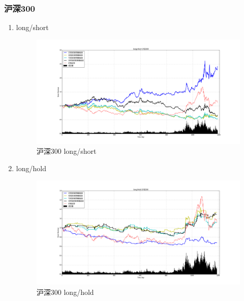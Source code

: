 \documentclass[12pt,a4paper]{article}
\begin{document}
\subsubsection{沪深300}
\begin{enumerate}
\item long/short 
\begin{figure}[H]
	\centering
	\includegraphics[width=1.0\textwidth]{img_r_7/hs300.png}
	\caption{沪深300 long/short }
\end{figure}
\item long/hold 
\begin{figure}[H]
	\centering
	\includegraphics[width=1.0\textwidth]{img_r_1/hs300_1.png}
	\caption{沪深300 long/hold }
\end{figure}
\end{enumerate}
\end{document}

